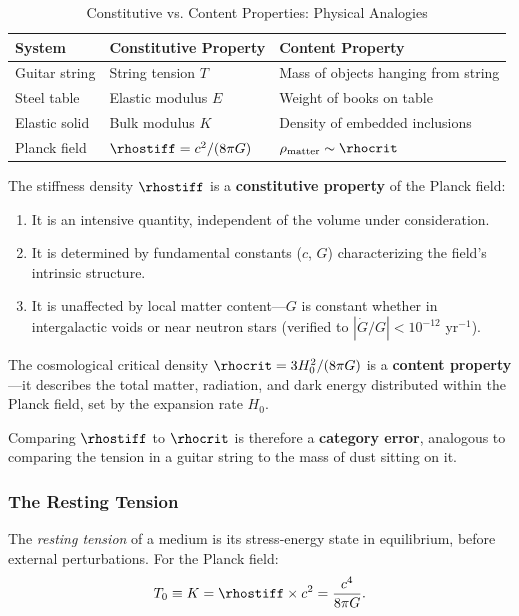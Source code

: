 \begin{table}[H]
\centering
\caption{Constitutive vs. Content Properties: Physical Analogies}
\label{tab:analogies}
\begin{tabular}{@{}lll@{}}
\toprule
\textbf{System} & \textbf{Constitutive Property} & \textbf{Content Property} \\
\midrule
Guitar string & String tension $T$ & Mass of objects hanging from string \\
Steel table & Elastic modulus $E$ & Weight of books on table \\
Elastic solid & Bulk modulus $K$ & Density of embedded inclusions \\
Planck field & $\rhostiff = c^2/(8\pi G)$ & $\rho_{\mathrm{matter}} \sim \rhocrit$ \\
\bottomrule
\end{tabular}
\end{table}

The stiffness density $\rhostiff$ is a \textbf{constitutive property} of the Planck field:
\begin{enumerate}[label=(\roman*)]
    \item It is an intensive quantity, independent of the volume under consideration.
    \item It is determined by fundamental constants ($c$, $G$) characterizing the field's intrinsic structure.
    \item It is unaffected by local matter content---$G$ is constant whether in intergalactic voids or near neutron stars (verified to $|\dot{G}/G| < 10^{-12}$ yr$^{-1}$).
\end{enumerate}

The cosmological critical density $\rhocrit = 3H_0^2/(8\pi G)$ is a \textbf{content property}---it describes the total matter, radiation, and dark energy distributed within the Planck field, set by the expansion rate $H_0$.

Comparing $\rhostiff$ to $\rhocrit$ is therefore a \textbf{category error}, analogous to comparing the tension in a guitar string to the mass of dust sitting on it.

\subsubsection{The Resting Tension}
\label{sec:T0_value}

The \emph{resting tension} of a medium is its stress-energy state in equilibrium, before external perturbations. For the Planck field:
\begin{equation}
\label{eq:T0_def}
T_0 \equiv K = \rhostiff \times c^2 = \frac{c^4}{8\pi G}.
\end{equation}

